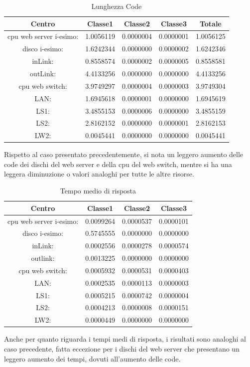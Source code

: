 \begin{table}[htbp]
\begin{center}
\begin{tabular}{|c|c|c|c|c|}
\hline
Centro &Classe1 &Classe2 &Classe3 &Totale\\
\hline
\hline
 cpu web server i-esimo: 	&1.0056119	&0.0000004	&0.0000001	&1.0056125\\
\hline
 disco i-esimo: 	&1.6242344	&0.0000000	&0.0000002	&1.6242346\\
\hline
 inLink: 	&0.8558574	&0.0000002	&0.0000005	&0.8558581\\
\hline
 outLink: 	&4.4133256	&0.0000000	&0.0000000	&4.4133256\\
\hline
 cpu web switch: 	&3.9749297	&0.0000004	&0.0000003	&3.9749304\\
\hline
 LAN: 	&1.6945618	&0.0000001	&0.0000000	&1.6945619\\
\hline
 LS1: 	&3.4855153	&0.0000006	&0.0000000	&3.4855159\\
\hline
 LS2: 	&2.8162152	&0.0000000	&0.0000001	&2.8162153\\
\hline
 LW2: 	&0.0045441	&0.0000000	&0.0000000	&0.0045441\\
\hline
\end{tabular}
\end{center}
\caption{Lunghezza Code}
\label{lunghezzacode}
\end{table}
Rispetto al caso presentato precedentemente, si nota un leggero aumento delle code dei dischi del web server e della cpu del web switch, mentre si ha una leggera diminuzione o valori analoghi per tutte le altre risorse.
\begin{table}[htbp]
\begin{center}
\begin{tabular}{|c|c|c|c|}
\hline
Centro &Classe1 &Classe2 &Classe3\\
\hline
\hline
 cpu web server i-esimo: 	&0.0099264	&0.0000537	&0.0000101\\
\hline
 disco i-esimo: 	&0.5745555	&0.0000000	&0.0000000\\
\hline
 inLink: 	&0.0002556	&0.0000278	&0.0000574\\
\hline
 outlink: 	&0.0013225	&0.0000000	&0.0000000\\
\hline
 cpu web switch: 	&0.0005932	&0.0000531	&0.0000403\\
\hline
 LAN: 	&0.0002535	&0.0000113	&0.0000003\\
\hline
 LS1: 	&0.0005215	&0.0000742	&0.0000004\\
\hline
 LS2: 	&0.0004213	&0.0000008	&0.0000151\\
\hline
 LW2: 	&0.0000449	&0.0000000	&0.0000000\\
\hline
\end{tabular}
\end{center}
\caption{Tempo medio di risposta}
\label{tempomediorisposta}
\end{table}
Anche per quanto riguarda i tempi medi di risposta, i risultati sono analoghi al caso precedente, fatta eccezione per i dischi del web server che presentano un leggero aumento dei tempi, dovuti all'aumento delle code.
